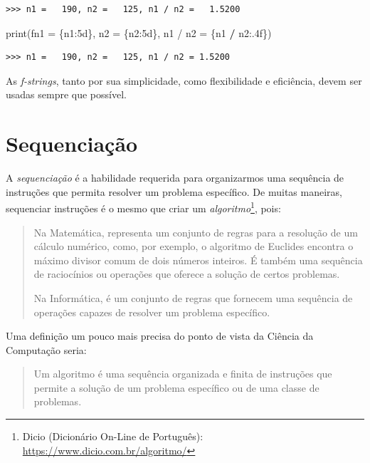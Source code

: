 \documentclass[
]{book}
\newenvironment{Shaded}{\begin{snugshade}}{\end{snugshade}}
\newcommand{\BuiltInTok}[1]{#1}
\newcommand{\NormalTok}[1]{#1}
\newcommand{\OperatorTok}[1]{\textcolor[rgb]{0.81,0.36,0.00}{\textbf{#1}}}
\newcommand{\SpecialCharTok}[1]{\textcolor[rgb]{0.00,0.00,0.00}{#1}}
\newcommand{\SpecialStringTok}[1]{\textcolor[rgb]{0.31,0.60,0.02}{#1}}
\begin{document}
\begin{verbatim}
>>> n1 =   190, n2 =   125, n1 / n2 =   1.5200
\end{verbatim}

\begin{Shaded}
\begin{Highlighting}[]
\BuiltInTok{print}\NormalTok{(}\SpecialStringTok{f\textquotesingle{}n1 = }\SpecialCharTok{\{n1:5d\}}\SpecialStringTok{, n2 = }\SpecialCharTok{\{n2:5d\}}\SpecialStringTok{, n1 / n2 = }\SpecialCharTok{\{n1} \OperatorTok{/} \SpecialCharTok{n2:.4f\}}\SpecialStringTok{\textquotesingle{}}\NormalTok{)}
\end{Highlighting}
\end{Shaded}

\begin{verbatim}
>>> n1 =   190, n2 =   125, n1 / n2 = 1.5200
\end{verbatim}

As \emph{f-strings}, tanto por sua simplicidade, como flexibilidade e eficiência, devem ser usadas sempre que possível.

\hypertarget{seque}{%
\chapter{Sequenciação}\label{seque}}

A \emph{sequenciação} é a habilidade requerida para organizarmos uma sequência de instruções que permita resolver um problema específico. De muitas maneiras, sequenciar instruções é o mesmo que criar um \emph{algoritmo}\footnote{Dicio (Dicionário On-Line de Português): \url{https://www.dicio.com.br/algoritmo/}}, pois:

\begin{quote}
Na Matemática, representa um conjunto de regras para a resolução de um cálculo numérico, como, por exemplo, o algoritmo de Euclides encontra o máximo divisor comum de dois números inteiros. É também uma sequência de raciocínios ou operações que oferece a solução de certos problemas.

Na Informática, é um conjunto de regras que fornecem uma sequência de operações capazes de resolver um problema específico.
\end{quote}

Uma definição um pouco mais precisa do ponto de vista da Ciência da Computação seria:

\begin{quote}
Um algoritmo é uma sequência organizada e finita de instruções que permite a solução de um problema específico ou de uma classe de problemas.
\end{quote}
\end{document}
